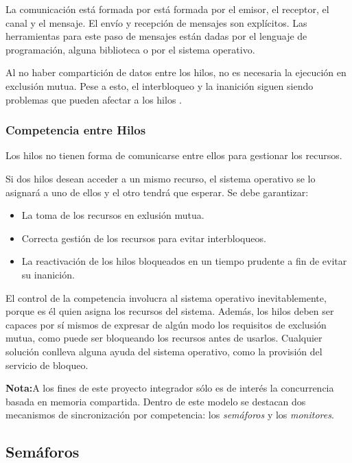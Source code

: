 La comunicación está formada por está formada por el emisor, el receptor, el
canal y el mensaje. El envío y recepción de mensajes son explícitos.
Las herramientas para este paso de mensajes están dadas por el lenguaje de
programación, alguna biblioteca o por el sistema operativo.

Al no haber compartición de datos entre los hilos, no es necesaria la
ejecución en exclusión mutua. Pese a esto, el interbloqueo y la inanición siguen
siendo problemas que pueden afectar a los hilos \cite{SistOpStallings}.

\subsubsection{Competencia entre Hilos}

Los hilos no tienen forma de comunicarse entre ellos para gestionar los
recursos.

Si dos hilos desean acceder a un mismo recurso, el sistema operativo se lo
asignará a uno de ellos y el otro tendrá que esperar. Se debe garantizar:
\begin{itemize}
    \item La toma de los recursos en exlusión mutua.
    \item Correcta gestión de los recursos para evitar interbloqueos.
    \item La reactivación de los hilos bloqueados en un tiempo prudente a fin de
    evitar su inanición.
\end{itemize}
El control de la competencia involucra al sistema operativo
inevitablemente, porque es él quien asigna los recursos del sistema.
Además, los hilos deben ser capaces por sí mismos de expresar de algún
modo los requisitos de exclusión mutua, como puede ser bloqueando los
recursos antes de usarlos. Cualquier solución conlleva alguna ayuda del
sistema operativo, como la provisión del servicio de
bloqueo.\cite{SistOpStallings}

\begin{framed}
\textbf{Nota:}A los fines de este proyecto integrador sólo es de interés la
concurrencia basada en memoria compartida. Dentro de este modelo se destacan dos
mecanismos de sincronización por competencia: los \textit{semáforos} y los
\textit{monitores}.
\end{framed}

\subsection{Semáforos}
\label{semaforos}

